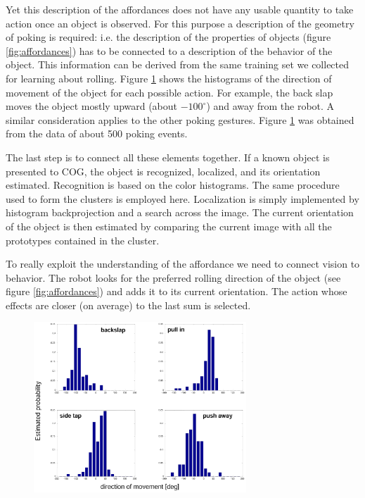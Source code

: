 Yet this description of the affordances does not have any usable quantity to 
take action once an object is observed. For this purpose a description of 
the geometry of poking is required: i.e. the description of the properties of 
objects (figure \ref{fig:affordances}) has to be connected to a description
of the behavior of the object. 
This information can be derived from the same training set we collected for learning
about rolling. Figure \ref{fig:actions} shows the histograms of the direction 
of movement of the object for
each possible action. For example, the back slap moves the object mostly upward
(about $-100^\circ$) and away from the robot. A similar consideration applies
to the other poking gestures. Figure \ref{fig:actions} was obtained from the data of
about 500 poking events.

The last step is to connect all these elements together. If a known object is
presented to COG, the object is recognized, localized, and
its orientation estimated. Recognition is based on the color histograms. The same
procedure used to form the clusters is employed here. Localization is simply implemented 
by histogram backprojection and a search across the image. The current orientation of the
object is then estimated by comparing the current image with all the prototypes 
contained in the cluster. 

To really exploit the understanding of the affordance we need to connect vision to 
behavior. The robot looks for the preferred rolling direction of the object
(see figure \ref{fig:affordances}) and adds it to its current orientation. 
The action whose effects are closer (on average) to the last sum is selected.


\begin{figure}[tb]
\begin{center}
\includegraphics[width=8cm]{actions.eps}
\caption{ 
\label{fig:actions}
%
%
}
\end{center}
\end{figure}



